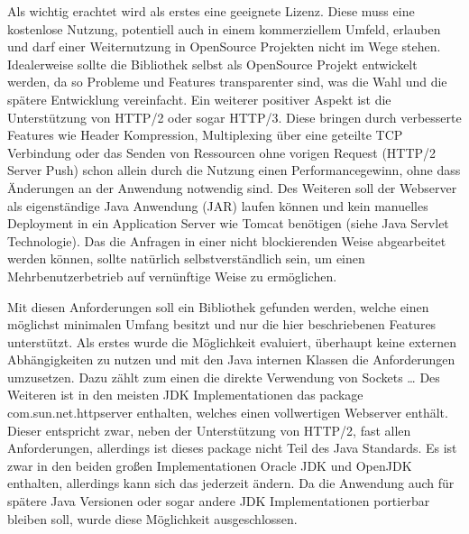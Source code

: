 Als wichtig erachtet wird als erstes eine geeignete Lizenz. Diese muss eine kostenlose Nutzung, potentiell auch in einem kommerziellem Umfeld, erlauben und darf einer Weiternutzung in OpenSource Projekten nicht im Wege stehen. Idealerweise sollte die Bibliothek selbst als OpenSource Projekt entwickelt werden, da so Probleme und Features transparenter sind, was die Wahl und die spätere Entwicklung vereinfacht. Ein weiterer positiver Aspekt ist die Unterstützung von HTTP/2 oder sogar HTTP/3. Diese bringen durch verbesserte Features wie Header Kompression, Multiplexing über eine geteilte TCP Verbindung oder das Senden von Ressourcen ohne vorigen Request (HTTP/2 Server Push) schon allein durch die Nutzung einen Performancegewinn, ohne dass Änderungen an der Anwendung notwendig sind. Des Weiteren soll der Webserver als eigenständige Java Anwendung (JAR) laufen können und kein manuelles Deployment in ein Application Server wie Tomcat benötigen (siehe Java Servlet Technologie). Das die Anfragen in einer nicht blockierenden Weise abgearbeitet werden können, sollte natürlich selbstverständlich sein, um einen Mehrbenutzerbetrieb auf vernünftige Weise zu ermöglichen.

Mit diesen Anforderungen soll ein Bibliothek gefunden werden, welche einen möglichst minimalen Umfang besitzt und nur die hier beschriebenen Features unterstützt. Als erstes wurde die Möglichkeit evaluiert, überhaupt keine externen Abhängigkeiten zu nutzen und mit den Java internen Klassen die Anforderungen umzusetzen. Dazu zählt zum einen die direkte Verwendung von Sockets …
Des Weiteren ist in den meisten JDK Implementationen das package com.sun.net.httpserver enthalten, welches einen vollwertigen Webserver enthält. Dieser entspricht zwar, neben der Unterstützung von HTTP/2, fast allen Anforderungen, allerdings ist dieses package nicht Teil des Java Standards. Es ist zwar in den beiden großen Implementationen Oracle JDK und OpenJDK enthalten, allerdings kann sich das jederzeit ändern. Da die Anwendung auch für spätere Java Versionen oder sogar andere JDK Implementationen portierbar bleiben soll, wurde diese Möglichkeit ausgeschlossen.


